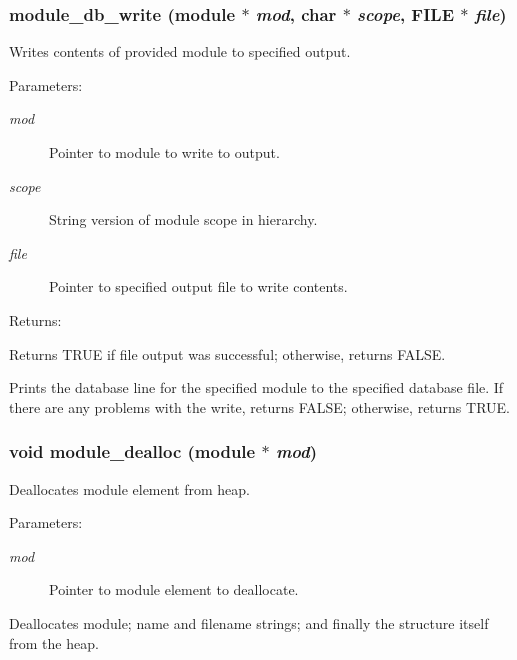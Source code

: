 \subsubsection{ module\_\-db\_\-write ({\bf module} $\ast$ {\em mod}, char $\ast$ {\em scope}, FILE $\ast$ {\em file})}\label{module_8c_a3}


Writes contents of provided module to specified output.

\begin{Desc}
\item[Parameters: ]\par
\begin{description}
\item[{\em 
mod}]Pointer to module to write to output. \item[{\em 
scope}]String version of module scope in hierarchy. \item[{\em 
file}]Pointer to specified output file to write contents. \end{description}
\end{Desc}
\begin{Desc}
\item[Returns: ]\par
Returns TRUE if file output was successful; otherwise, returns FALSE.\end{Desc}
Prints the database line for the specified module to the specified database file. If there are any problems with the write, returns FALSE; otherwise, returns TRUE. 
\subsubsection{\setlength{\rightskip}{0pt plus 5cm}void module\_\-dealloc ({\bf module} $\ast$ {\em mod})}\label{module_8c_a8}


Deallocates module element from heap.

\begin{Desc}
\item[Parameters: ]\par
\begin{description}
\item[{\em 
mod}]Pointer to module element to deallocate.\end{description}
\end{Desc}
Deallocates module; name and filename strings; and finally the structure itself from the heap. 
